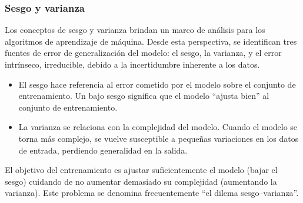 %
\subsubsection{Sesgo y varianza}
%
Los conceptos de sesgo y varianza brindan un marco de análisis para
los algoritmos de aprendizaje de máquina. Desde esta perspectiva, se
identifican tres fuentes de error de generalización del modelo: el
sesgo, la varianza, y el error intrínseco, irreducible, debido a la
incertidumbre inherente a los datos.
%
\begin{itemize}
\item El sesgo hace referencia al error cometido por el modelo sobre
  el conjunto de entrenamiento. Un bajo sesgo significa que el modelo
  ``ajusta bien'' al conjunto de entrenamiento.
\item La varianza se relaciona con la complejidad del modelo. Cuando
  el modelo se torna más complejo, se vuelve susceptible a pequeñas
  variaciones en los datos de entrada, perdiendo generalidad en la
  salida.
\end{itemize}
%
El objetivo del entrenamiento es ajustar suficientemente el modelo
(bajar el sesgo) cuidando de no aumentar demasiado su complejidad
(aumentando la varianza).  Este problema se denomina frecuentemente
``el dilema sesgo--varianza''.







